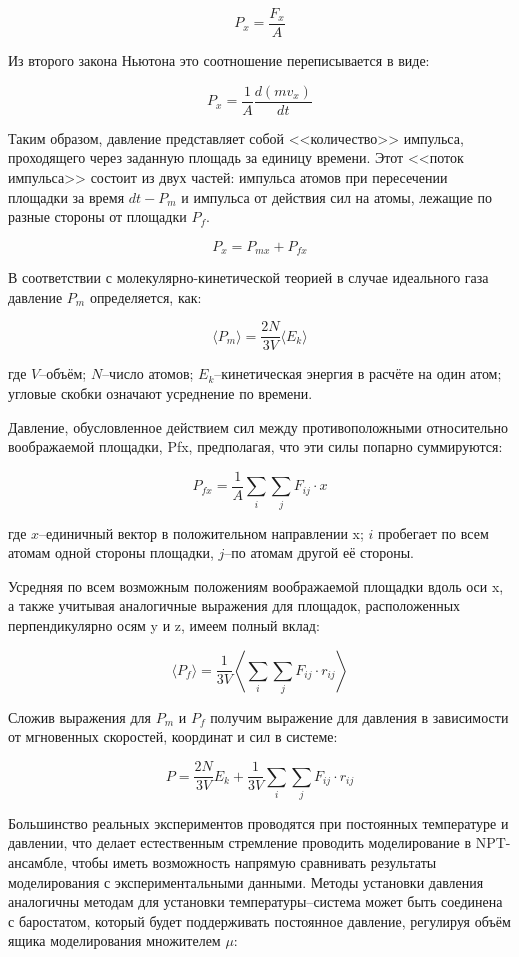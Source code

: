 \[
P_x=\frac{F_x}{A}
\]

Из второго закона Ньютона это соотношение переписывается в виде:

\[
P_x = {\frac{1}{A}} {\frac{d(m v_x)}{dt}}
\]

Таким образом, давление представляет собой <<количество>> импульса, проходящего через заданную площадь за единицу времени. Этот <<поток импульса>> состоит из двух частей: импульса атомов при пересечении площадки за время $dt-P_m$ и импульса от действия сил на атомы, лежащие по разные стороны от площадки $P_f$. 

\[
P_x=P_{mx}+P_{fx}
\]

В соответствии с молекулярно-кинетической теорией в случае идеального газа давление $P_m$ определяется, как:

\[
\langle P_m \rangle = \frac{2 N}{3 V} \langle E_k \rangle
\]

где $V$--объём; $N$--число атомов; $E_k$--кинетическая энергия в расчёте на один атом; угловые скобки означают усреднение по времени.

Давление, обусловленное действием сил между противоположными относительно воображаемой площадки, Pfx, предполагая, что эти силы попарно суммируются: 

\[
P_{fx} = \frac{1}{A} \sum_i \sum_j {F_{ij} \cdot x}
\]

где $x$--единичный вектор в положительном направлении x; $i$ пробегает по всем атомам одной стороны площадки, $j$--по атомам другой её стороны.

Усредняя по всем возможным положениям воображаемой площадки вдоль оси x, а также учитывая аналогичные выражения для площадок, расположенных перпендикулярно осям y и z, имеем полный вклад:

\[
\langle P_f \rangle = \frac{1}{3 V} \left \langle \sum_i \sum_j {F_{ij} \cdot r_{ij}} \right \rangle
\]

Сложив выражения для $P_m$ и $P_f$ получим выражение для давления в зависимости от мгновенных скоростей, координат и сил в системе:

\[
P = \frac{2 N}{3 V} E_k + \frac{1}{3 V} \sum_i \sum_j {F_{ij} \cdot r_{ij}}
\]

Большинство реальных экспериментов проводятся при постоянных температуре и давлении, что делает естественным стремление проводить моделирование в NPT-ансамбле, чтобы иметь возможность напрямую сравнивать результаты моделирования с экспериментальными данными. Методы установки давления аналогичны методам для установки температуры--система может быть соединена с баростатом, который будет поддерживать постоянное давление, регулируя объём ящика моделирования множителем $\mu$:


